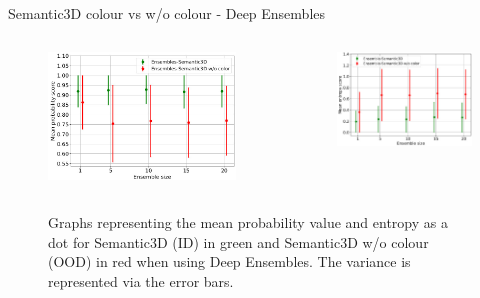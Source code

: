 \documentclass[aspectratio=169]{beamer}
\begin{document}
\begin{frame}{Semantic3D colour vs w/o colour - Deep Ensembles}
    \begin{columns}
        \begin{column}{0.5\textwidth}
            \begin{figure}
                \centering
                \includegraphics[scale=0.25]{images/ood2/DE_MSP_OOD2.jpg}
            \end{figure}
        \end{column}
        \begin{column}{0.5\textwidth}
            \begin{figure}
                \centering
                \includegraphics[scale=0.32]{images/ood2/DE_Ent_OOD2.jpg}
            \end{figure}
        \end{column}
    \end{columns}
    \begin{figure}
        \caption{Graphs representing the mean probability value and entropy as a dot for Semantic3D (ID) in green and
        Semantic3D w/o colour (OOD) in red when using Deep Ensembles. The variance is represented via the error bars.}
    \end{figure}
\end{frame}
\end{document}
